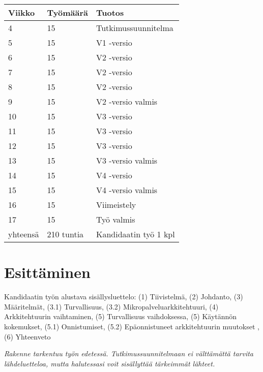 \documentclass[12pt,a4paper,finnish,oneside]{article}
\begin{document}
\begin{tabular}{|p{20mm}|p{30mm}|p{95mm}|}
\hline
Viikko   & Työmäärä   & Tuotos                \\ \hline
4        & 15         & Tutkimussuunnitelma   \\ \hline
5        & 15         & V1 -versio            \\ \hline
6        & 15         & V2 -versio            \\ \hline
7        & 15         & V2 -versio            \\ \hline
8        & 15         & V2 -versio            \\ \hline
9        & 15         & V2 -versio valmis     \\ \hline
10       & 15         & V3 -versio            \\ \hline
11       & 15         & V3 -versio            \\ \hline
12       & 15         & V3 -versio            \\ \hline
13       & 15         & V3 -versio valmis     \\ \hline
14       & 15         & V4 -versio            \\ \hline
15       & 15         & V4 -versio valmis     \\ \hline
16       & 15         & Viimeistely           \\ \hline
17       & 15         & Työ valmis            \\ \hline
yhteensä & 210 tuntia & Kandidaatin työ 1 kpl \\ \hline
\end{tabular}


\section{Esittäminen}

Kandidaatin työn alustava sisällysluettelo:
(1) Tiivistelmä,
(2) Johdanto,
(3) Määritelmät,
(3.1) Turvallisuus,
(3.2) Mikropalveluarkkitehtuuri,
(4) Arkkitehtuurin vaihtaminen,
(5) Turvallisuus vaihdoksessa,
(5) Käytännön kokemukset,
(5.1) Onnistumiset,
(5.2) Epäonnistuneet arkkitehtuurin muutokset ,
(6) Yhteenveto

%

\emph{Rakenne tarkentuu työn edetessä. Tutkimussuunnitelmaan ei välttämättä tarvita lähdeluetteloa, mutta halutessasi voit sisällyttää tärkeimmät lähteet.}

%
\end{document}
